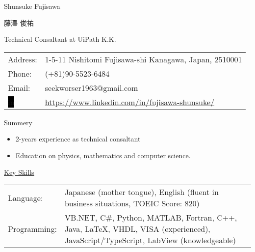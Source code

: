 \documentclass[a4paper,12pt]{ltjsarticle}
\begin{document}
\pagestyle{empty}
\begin{multicols}{2}
\setlength{\columnsep}{4pt}
\setlength{\tabcolsep}{2pt}
\huge
\noindent
\textsf{Shunsuke Fujisawa}\par\noindent
\textsf{藤澤 俊祐}\par\noindent
\columnbreak
\normalsize
\color{gray}
Technical Consaltant at UiPath K.K.\par\noindent
\color{black}
\small
\begin{tabularx}{0.9\linewidth}{lX}
Address:&1-5-11 Nishitomi Fujisawa-shi Kanagawa, Japan, 2510001\\
Phone:& (+81)90-5523-6484\\
Email:&seekworser1963@gmail.com\\
\color{white}
\colorbox{black}{\textsf{in}}&\url{https://www.linkedin.com/in/fujisawa-shunsuke/}
\end{tabularx}
\end{multicols}
\Large\noindent
\uline{\textsf{Summery}\hspace{\fill}}
\normalsize\par\noindent

\begin{itemize}
    \item 2-years experience as technical consaltant
    \item Education on physics, mathematics and computer science.
\end{itemize}

\Large\noindent
\uline{\textsf{Key Skills}\hspace{\fill}}
\normalsize\par\noindent
\begin{tabularx}{0.9\linewidth}{lX}
    Language:&Japanese (mother tongue), English (fluent in business situations, TOEIC Score: 820)\\
    Programming:&VB.NET, C\#, Python, MATLAB, Fortran, C++, Java, LaTeX, VHDL, VISA (experienced), JavaScript/TypeScript, LabView (knowledgeable)
\end{tabularx}
\end{document}
